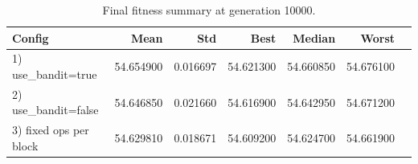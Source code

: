\begin{table}[htbp]
\centering
\caption{Final fitness summary at generation 10000.}
\label{tab:final_fitness_summary}
\begin{tabular}{lrrrrrr}
\toprule
Config & Mean & Std & Best & Median & Worst \\
\midrule
1) use_bandit=true & 54.654900 & 0.016697 & 54.621300 & 54.660850 & 54.676100 \\
2) use_bandit=false & 54.646850 & 0.021660 & 54.616900 & 54.642950 & 54.671200 \\
3) fixed ops per block & 54.629810 & 0.018671 & 54.609200 & 54.624700 & 54.661900 \\
\bottomrule
\end{tabular}
\end{table}
